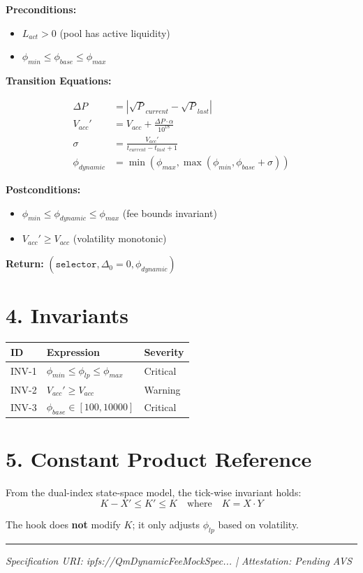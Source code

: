 \documentclass[11pt,a4paper]{article}
\begin{document}
\textbf{Preconditions:}
\begin{itemize}
\setlength\itemsep{-0.2em}
\item $L_{act} > 0$ (pool has active liquidity)
\item $\phi_{min} \leq \phi_{base} \leq \phi_{max}$
\end{itemize}

\textbf{Transition Equations:}

\begin{align}
\Delta P &= \left| \sqrt{P}_{current} - \sqrt{P}_{last} \right| \label{eq:delta_p}\\[0.3em]
V_{acc}' &= V_{acc} + \frac{\Delta P \cdot \alpha}{10^{18}} \label{eq:vacc}\\[0.3em]
\sigma &= \frac{V_{acc}'}{t_{current} - t_{last} + 1} \label{eq:sigma}\\[0.3em]
\phi_{dynamic} &= \min\left(\phi_{max}, \max\left(\phi_{min}, \phi_{base} + \sigma\right)\right) \label{eq:phi}
\end{align}

\textbf{Postconditions:}
\begin{itemize}
\setlength\itemsep{-0.2em}
\item $\phi_{min} \leq \phi_{dynamic} \leq \phi_{max}$ (fee bounds invariant)
\item $V_{acc}' \geq V_{acc}$ (volatility monotonic)
\end{itemize}

\textbf{Return:} $(\texttt{selector}, \Delta_0 = 0, \phi_{dynamic})$

\section*{4. Invariants}

\begin{center}
\begin{tabular}{lll}
\toprule
\textbf{ID} & \textbf{Expression} & \textbf{Severity} \\
\midrule
INV-1 & $\phi_{min} \leq \phi_{lp} \leq \phi_{max}$ & Critical \\
INV-2 & $V_{acc}' \geq V_{acc}$ & Warning \\
INV-3 & $\phi_{base} \in [100, 10000]$ & Critical \\
\bottomrule
\end{tabular}
\end{center}

\section*{5. Constant Product Reference}

From the dual-index state-space model, the tick-wise invariant holds:
$$K - X' \leq K' \leq K \quad \text{where} \quad K = X \cdot Y$$

The hook does \textbf{not} modify $K$; it only adjusts $\phi_{lp}$ based on volatility.

\vspace{0.5em}
\hrule
\vspace{0.3em}
\begin{center}
\small\textit{Specification URI: ipfs://QmDynamicFeeMockSpec... | Attestation: Pending AVS}
\end{center}
\end{document}

